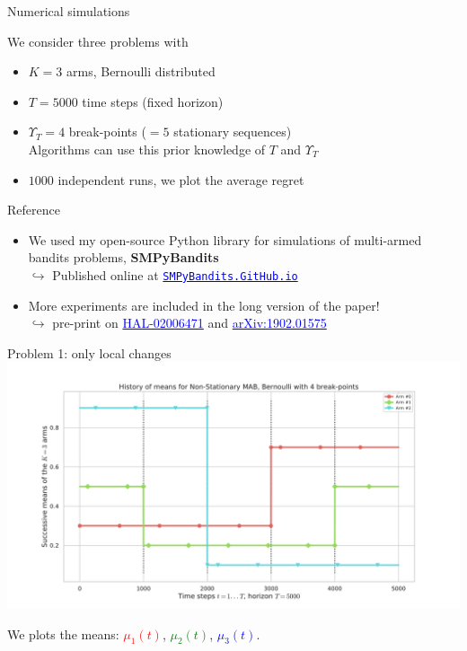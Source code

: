 \documentclass[11pt,english,ignorenonframetext,]{beamer}
\begin{document}
\begin{frame}{Numerical simulations}

  \begin{block}{We consider three problems with}
    \begin{itemize}
      \item
      $K=3$ arms, Bernoulli distributed
      \item
      $T=5000$ time steps (fixed horizon)
      \item
      $\Upsilon_T=4$ break-points ($=5$ stationary sequences)\\
      Algorithms can use this prior knowledge of $T$ and $\Upsilon_T$
      \item
      $1000$ independent runs, we plot the average regret
    \end{itemize}
  \end{block}

  \pause

  \begin{exampleblock}{Reference}
    \begin{itemize}
      \item
      We used my open-source Python library for simulations of multi-armed bandits problems, \textbf{SMPyBandits}
      \\
      $\hookrightarrow$ Published online at \href{https://SMPyBandits.GitHub.io}{\textcolor{blue}{\texttt{SMPyBandits.GitHub.io}}}
      \item
      More experiments are included in the long version of the paper!\\
      $\hookrightarrow$ pre-print on
      \href{https://hal.inria.fr/hal-02006471}{\textcolor{blue}{HAL-02006471}}
      and
      \href{https://arxiv.org/abs/1902.01575}{\textcolor{blue}{arXiv:1902.01575}}
    \end{itemize}
  \end{exampleblock}

\end{frame}


\begin{frame}[plain]{Problem 1: only local changes}
  \centering
  \includegraphics[width=1.00\textwidth]{figures/Problem_1.pdf}

  We plots the means:
  \textcolor{red}{$\mu_1(t)$},
  \textcolor{green}{$\mu_2(t)$},
  \textcolor{blue}{$\mu_3(t)$}.
\end{frame}
\end{document}
